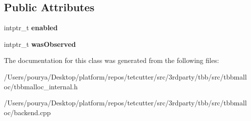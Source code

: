 \subsection*{Public Attributes}
\begin{DoxyCompactItemize}
\item 
\hypertarget{classrml_1_1internal_1_1HugePagesStatus_afbe12a9a5f6a65a91d3d79ea8521e411}{}intptr\+\_\+t {\bfseries enabled}\label{classrml_1_1internal_1_1HugePagesStatus_afbe12a9a5f6a65a91d3d79ea8521e411}

\item 
\hypertarget{classrml_1_1internal_1_1HugePagesStatus_a3e3d20dc8bf801150845ad56dc6004cf}{}intptr\+\_\+t {\bfseries was\+Observed}\label{classrml_1_1internal_1_1HugePagesStatus_a3e3d20dc8bf801150845ad56dc6004cf}

\end{DoxyCompactItemize}


The documentation for this class was generated from the following files\+:\begin{DoxyCompactItemize}
\item 
/\+Users/pourya/\+Desktop/platform/repos/tetcutter/src/3rdparty/tbb/src/tbbmalloc/tbbmalloc\+\_\+internal.\+h\item 
/\+Users/pourya/\+Desktop/platform/repos/tetcutter/src/3rdparty/tbb/src/tbbmalloc/backend.\+cpp\end{DoxyCompactItemize}
